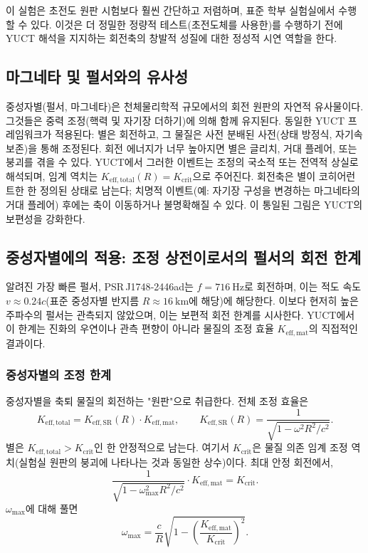 \documentclass[12pt,a4paper]{article}
\newcommand{\Kefftot}{K_{\mathrm{eff,total}}}
\newcommand{\Kcrit}{K_{\mathrm{crit}}}
\begin{document}
	이 실험은 초전도 원판 시험보다 훨씬 간단하고 저렴하며, 표준 학부 실험실에서 수행할 수 있다. 이것은 더 정밀한 정량적 테스트(초전도체를 사용한)를 수행하기 전에 YUCT 해석을 지지하는 회전축의 창발적 성질에 대한 정성적 시연 역할을 한다.
	
	\subsection{마그네타 및 펄서와의 유사성}
	
	중성자별(펄서, 마그네타)은 천체물리학적 규모에서의 회전 원판의 자연적 유사물이다. 그것들은 중력 조정(핵력 및 자기장 더하기)에 의해 함께 유지된다. 동일한 YUCT 프레임워크가 적용된다: 별은 회전하고, 그 물질은 사전 분배된 사전(상태 방정식, 자기속 보존)을 통해 조정된다. 회전 에너지가 너무 높아지면 별은 글리치, 거대 플레어, 또는 붕괴를 겪을 수 있다. YUCT에서 그러한 이벤트는 조정의 국소적 또는 전역적 상실로 해석되며, 임계 역치는 \(\Kefftot(R) = \Kcrit\)으로 주어진다. 회전축은 별이 코히어런트한 한 정의된 상태로 남는다; 치명적 이벤트(예: 자기장 구성을 변경하는 마그네타의 거대 플레어) 후에는 축이 이동하거나 불명확해질 수 있다. 이 통일된 그림은 YUCT의 보편성을 강화한다.
	
	\subsection{중성자별에의 적용: 조정 상전이로서의 펄서의 회전 한계}
	
	알려진 가장 빠른 펄서, PSR J1748‑2446ad는 \(f = 716\ \text{Hz}\)로 회전하며, 이는 적도 속도 \(v \approx 0.24c\)(표준 중성자별 반지름 \(R\approx 16\ \text{km}\)에 해당)에 해당한다. 이보다 현저히 높은 주파수의 펄서는 관측되지 않았으며, 이는 보편적 회전 한계를 시사한다. YUCT에서 이 한계는 진화의 우연이나 관측 편향이 아니라 물질의 조정 효율 \(K_{\mathrm{eff,mat}}\)의 직접적인 결과이다.
	
	\subsubsection{중성자별의 조정 한계}
	
	중성자별을 축퇴 물질의 회전하는 "원판"으로 취급한다. 전체 조정 효율은
	\[
	K_{\mathrm{eff,total}} = K_{\mathrm{eff,SR}}(R) \cdot K_{\mathrm{eff,mat}},
	\qquad
	K_{\mathrm{eff,SR}}(R) = \frac{1}{\sqrt{1 - \omega^2 R^2/c^2}}.
	\]
	별은 \(K_{\mathrm{eff,total}} > K_{\mathrm{crit}}\)인 한 안정적으로 남는다. 여기서 \(K_{\mathrm{crit}}\)은 물질 의존 임계 조정 역치(실험실 원판의 붕괴에 나타나는 것과 동일한 상수)이다. 최대 안정 회전에서,
	\[
	\frac{1}{\sqrt{1 - \omega_{\max}^2 R^2/c^2}} \cdot K_{\mathrm{eff,mat}} = K_{\mathrm{crit}}.
	\]
	\(\omega_{\max}\)에 대해 풀면
	\[
	\omega_{\max} = \frac{c}{R}\sqrt{1 - \left(\frac{K_{\mathrm{eff,mat}}}{K_{\mathrm{crit}}}\right)^2}.
	\]
	
\end{document}
